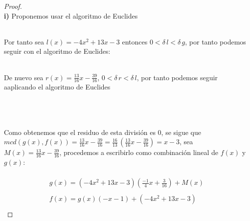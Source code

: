 \documentclass[11pt,letterpaper]{article}
\newcommand{\Q}{\mathbb{Q}}
\begin{document}
\newpage
{}
\begin{proof}\,\\
    \textbf{i)}\,\,Proponemos usar el algoritmo de Euclides
    \,\\
    \begin{center}
\end{center}\,\\
Por tanto sea $l(x)=-4x^2+13x-3$ entonces $0<\delta\,l< \delta\,g$, por tanto podemos seguir con el algoritmo 
de Euclides:\,\\
\begin{center}
\end{center}\,\\
De nuevo sea $r(x)=\frac{13}{16}x-\frac{39}{16}$, $0<\delta\,r<\delta\,l$, por tanto podemos seguir aaplicando el algoritmo de Euclides\,\\
\,\\
\begin{center}
\end{center}\,\\
\newpage
\,\\
Como obtenemos que el residuo de esta divisi\'on es $0$, se sigue que\\ $mcd(g(x),f(x))=\frac{13}{16}x-\frac{39}{16}=\frac{16}{13}\,(\frac{13}{16}x-\frac{39}{16})=x-3$, sea
$M(x)=\frac{13}{16}x-\frac{39}{16}$, procedemos a escribirlo como combinaci\'on lineal de $f(x)$ y $g(x)$:\,\\
\,\\
\begin{align*}
    g(x)=(-4x^2+13x-3)\left(\frac{-1}{4}x+\frac{3}{16}\right)+M(x)\,\\
    \,\\
    f(x)=g(x)(-x-1)+(-4x^2+13x-3)\,\\

\end{align*}
\end{proof}
\end{document}
